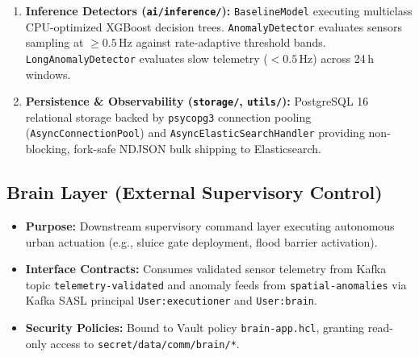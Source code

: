 \documentclass[10pt,a4paper]{report}
\begin{document}
\begin{enumerate}
\begin{itemize}
    \item \texttt{StaticCheck}: Instantaneous physical boundary filters (\texttt{out\_of\_range}), silence detection (\texttt{sensor\_is\_down} after 10\,s), and gross spatial divergence (\texttt{spoofed\_data} against $k=5$ cluster neighbors).
    \item \texttt{PreProcess}: 20\,s short-window feature extraction running Robust $Z$-score scaling ($\text{MAD} \times 1.4826$), sign-flip oscillation rates, difference kurtosis, and Haar wavelet energy decoupling.
    \item \texttt{LongPreProcess}: 24\,h long-window batch processing resampling readings onto a 300\,s regular time-grid, calculating trend-to-scatter linear regression ratios, flat-run share, and neighbor slope deltas.
  \end{itemize}
  \item \textbf{Inference Detectors (\texttt{ai/inference/}):}
  \texttt{BaselineModel} executing multiclass CPU-optimized XGBoost decision trees. \texttt{AnomalyDetector} evaluates sensors sampling at $\ge 0.5$\,Hz against rate-adaptive threshold bands. \texttt{LongAnomalyDetector} evaluates slow telemetry ($< 0.5$\,Hz) across 24\,h windows.
  \item \textbf{Persistence \& Observability (\texttt{storage/}, \texttt{utils/}):}
  PostgreSQL 16 relational storage backed by \texttt{psycopg3} connection pooling (\texttt{AsyncConnectionPool}) and \texttt{AsyncElasticSearchHandler} providing non-blocking, fork-safe NDJSON bulk shipping to Elasticsearch.
\end{enumerate}

\subsection{Brain Layer (External Supervisory Control)}
\begin{itemize}[leftmargin=*]
  \item \textbf{Purpose:} Downstream supervisory command layer executing autonomous urban actuation (e.g., sluice gate deployment, flood barrier activation).
  \item \textbf{Interface Contracts:} Consumes validated sensor telemetry from Kafka topic \texttt{telemetry-validated} and anomaly feeds from \texttt{spatial-anomalies} via Kafka SASL principal \texttt{User:executioner} and \texttt{User:brain}.
  \item \textbf{Security Policies:} Bound to Vault policy \texttt{brain-app.hcl}, granting read-only access to \texttt{secret/data/comm/brain/*}.
\end{itemize}
\end{document}
